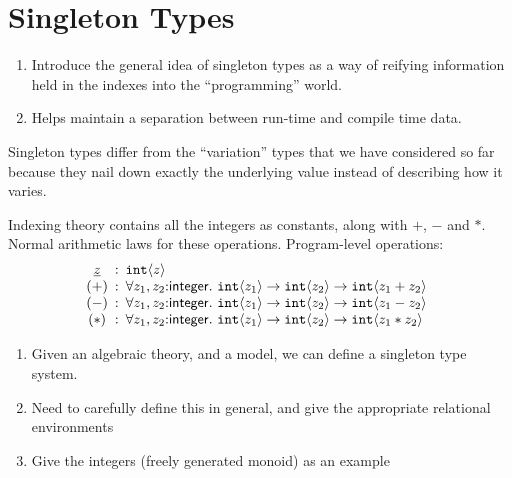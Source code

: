 \section{Singleton Types}
\label{sec:singleton-types}

\newcommand{\Sing}{\mathit{Sing}}



\begin{enumerate}
\item Introduce the general idea of singleton types as a way of
  reifying information held in the indexes into the ``programming''
  world.
\item Helps maintain a separation between run-time and compile time
  data.
\end{enumerate}

Singleton types differ from the ``variation'' types that we have
considered so far because they nail down exactly the underlying value
instead of describing how it varies.

Indexing theory contains all the integers as constants, along with
$+$, $-$ and $*$. Normal arithmetic laws for these
operations. Program-level operations:
\begin{displaymath}
  \begin{array}{@{}c@{\hspace{0.5em}:\hspace{0.5em}}l}
    \underline{z} & \tyPrim{int}{z} \\ %
    (+) & \forall z_1,z_2\mathord:\mathsf{integer}.\ \tyPrim{int}{z_1} \to \tyPrim{int}{z_2} \to \tyPrim{int}{z_1 + z_2} \\
    (-) & \forall z_1,z_2\mathord:\mathsf{integer}.\ \tyPrim{int}{z_1} \to \tyPrim{int}{z_2} \to \tyPrim{int}{z_1 - z_2} \\
    (*) & \forall z_1,z_2\mathord:\mathsf{integer}.\ \tyPrim{int}{z_1} \to \tyPrim{int}{z_2} \to \tyPrim{int}{z_1 * z_2}
  \end{array}
\end{displaymath}

\begin{enumerate}
\item Given an algebraic theory, and a model, we can define a
  singleton type system.
\item Need to carefully define this in general, and give the
  appropriate relational environments
\item Give the integers (freely generated monoid) as an example
\end{enumerate}

